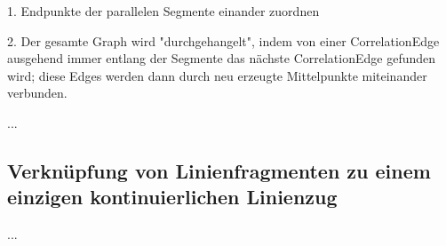 \documentclass[../main/thesis.tex]{subfiles}
\begin{document}
1. Endpunkte der parallelen Segmente einander zuordnen

2. Der gesamte Graph wird "durchgehangelt", indem von einer CorrelationEdge ausgehend immer entlang der Segmente das nächste CorrelationEdge gefunden wird; diese Edges werden dann durch neu erzeugte Mittelpunkte miteinander verbunden.





...


\subsection{Verknüpfung von Linienfragmenten zu einem einzigen kontinuierlichen Linienzug}

...


\end{document}
